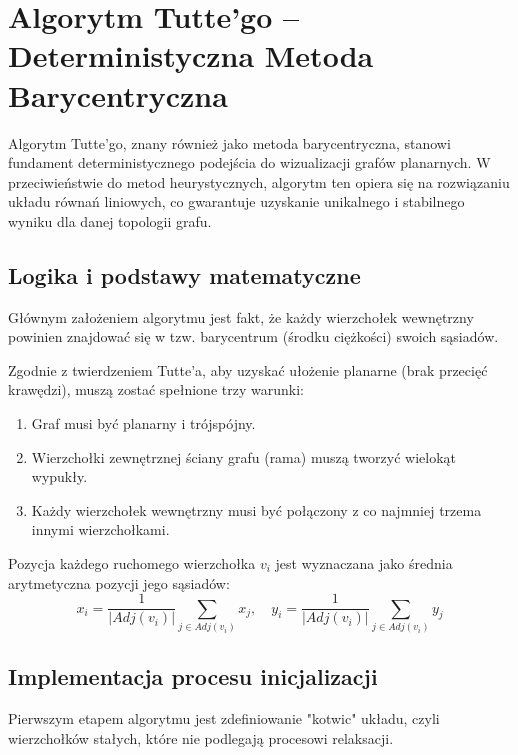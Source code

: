\documentclass[12pt,a4paper]{article}
\begin{document}
\section{Algorytm Tutte'go – Deterministyczna Metoda Barycentryczna}

Algorytm Tutte'go, znany również jako metoda barycentryczna, stanowi fundament deterministycznego podejścia do wizualizacji grafów planarnych. W przeciwieństwie do metod heurystycznych, algorytm ten opiera się na rozwiązaniu układu równań liniowych, co gwarantuje uzyskanie unikalnego i stabilnego wyniku dla danej topologii grafu.

\subsection{Logika i podstawy matematyczne}
Głównym założeniem algorytmu jest fakt, że każdy wierzchołek wewnętrzny powinien znajdować się w tzw. barycentrum (środku ciężkości) swoich sąsiadów. 

Zgodnie z twierdzeniem Tutte'a, aby uzyskać ułożenie planarne (brak przecięć krawędzi), muszą zostać spełnione trzy warunki:
\begin{enumerate}
    \item Graf musi być planarny i trójspójny.
    \item Wierzchołki zewnętrznej ściany grafu (rama) muszą tworzyć wielokąt wypukły.
    \item Każdy wierzchołek wewnętrzny musi być połączony z co najmniej trzema innymi wierzchołkami.
\end{enumerate}

Pozycja każdego ruchomego wierzchołka $v_i$ jest wyznaczana jako średnia arytmetyczna pozycji jego sąsiadów:
\[ x_i = \frac{1}{|Adj(v_i)|} \sum_{j \in Adj(v_i)} x_j, \quad y_i = \frac{1}{|Adj(v_i)|} \sum_{j \in Adj(v_i)} y_j \]

\subsection{Implementacja procesu inicjalizacji}
Pierwszym etapem algorytmu jest zdefiniowanie "kotwic" układu, czyli wierzchołków stałych, które nie podlegają procesowi relaksacji.
\end{document}
